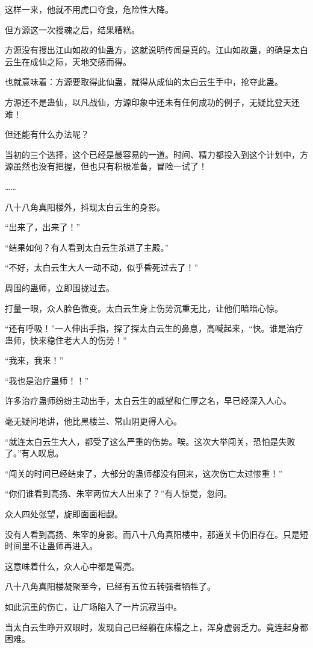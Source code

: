 \begin{this_body}
这样一来，他就不用虎口夺食，危险性大降。

但方源这一次搜魂之后，结果糟糕。

方源没有搜出江山如故的仙蛊方，这就说明传闻是真的。江山如故蛊，的确是太白云生在成仙之际，天地交感而得。

也就意味着：方源要取得此仙蛊，就得从成仙的太白云生手中，抢夺此蛊。

方源还不是蛊仙，以凡战仙，方源印象中还未有任何成功的例子，无疑比登天还难！

但还能有什么办法呢？

当初的三个选择，这个已经是最容易的一道。时间、精力都投入到这个计划中，方源虽然也没有把握，但也只有积极准备，冒险一试了！

……

八十八角真阳楼外，抖现太白云生的身影。

“出来了，出来了！”

“结果如何？有人看到太白云生杀进了主殿。”

“不好，太白云生大人一动不动，似乎昏死过去了！”

周围的蛊师，立即围拢过去。

打量一眼，众人脸色微变。太白云生身上伤势沉重无比，让他们暗暗心惊。

“还有呼吸！”一人伸出手指，探了探太白云生的鼻息，高喊起来，“快。谁是治疗蛊师，快来稳住老大人的伤势！”

“我来，我来！”

“我也是治疗蛊师！！”

许多治疗蛊师纷纷主动出手，太白云生的威望和仁厚之名，早已经深入人心。

毫无疑问地讲，他比黑楼兰、常山阴更得人心。

“就连太白云生大人，都受了这么严重的伤势。唉。这次大举闯关，恐怕是失败了。”有人叹息。

“闯关的时间已经结束了，大部分的蛊师都没有回来，这次伤亡太过惨重！”

“你们谁看到高扬、朱宰两位大人出来了？”有人惊觉，忽问。

众人四处张望，旋即面面相觑。

没有人看到高扬、朱宰的身影。而八十八角真阳楼中，那道关卡仍旧存在。只是短时间里不让蛊师再进入。

这意味着什么，众人心中都是雪亮。

八十八角真阳楼凝聚至今，已经有五位五转强者牺牲了。

如此沉重的伤亡，让广场陷入了一片沉寂当中。

当太白云生睁开双眼时，发现自己已经躺在床榻之上，浑身虚弱乏力。竟连起身都困难。


\end{this_body}
